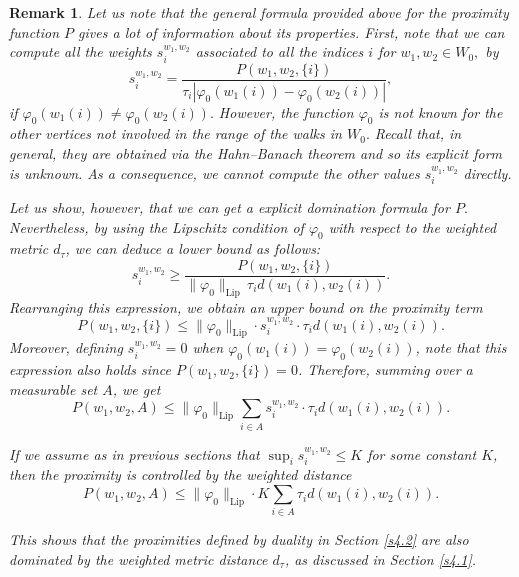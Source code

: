\documentclass[preprint,12pt]{elsarticle}
\newtheorem{remark}[theorem]{Remark}
\begin{document}
\begin{remark} \label{remal}
Let us note that the general formula provided above for the proximity function $P$ gives a lot of information about its properties. First, note that we can compute all the weights $s_i^{w_1,w_2}$ associated to all the indices  $i$ for $w_1,w_2 \in W_0,$ by
$$
s_i^{w_1,w_2} = \frac{ P(w_1, w_2, \{i\}) }{\tau_i \left| \varphi_0(w_1(i)) - \varphi_0(w_2(i)) \right|},
$$
if $\varphi_0(w_1(i))\neq\varphi_0(w_2(i)).$ 
However, the function $\varphi_0$ is not known for the other vertices not involved in the range of the walks in $W_0.$ Recall that, in general, they are obtained via the Hahn–Banach theorem and so its explicit form is unknown. 
As a consequence, we cannot compute the other values $s_i^{w_1,w_2}$ directly.

Let us show, however, that we can get a explicit domination formula for $P.$
Nevertheless, by using the Lipschitz condition of $\varphi_0$ with respect to the weighted metric $d_\tau$, we can deduce a lower bound as follows:
$$
s_i^{w_1,w_2} \geq \frac{ P(w_1, w_2, \{i\})}{\|\varphi_0\|_{\mathrm{Lip}} \, \tau_i d(w_1(i), w_2(i))}.
$$
Rearranging this expression, we obtain an upper bound on the proximity term
$$
P(w_1, w_2, \{i\}) \leq \|\varphi_0\|_{\mathrm{Lip}} \cdot s_i^{w_1,w_2} \cdot \tau_i d(w_1(i), w_2(i)).
$$
Moreover, defining $s_i^{w_1,w_2}=0$ when $\varphi_0(w_1(i))=\varphi_0(w_2(i))$, note that this expression also holds since $P(w_1, w_2, \{i\})=0$. Therefore, summing over a measurable set $A$, we get
$$
P(w_1, w_2, A) \leq \|\varphi_0\|_{\mathrm{Lip}} \sum_{i \in A} s_i^{w_1,w_2} \cdot \tau_i d(w_1(i), w_2(i)).
$$

If we assume as  in previous sections that $\sup_i s_i^{w_1,w_2} \leq K$ for some constant $K$, then the proximity is controlled by the weighted distance
$$
P(w_1, w_2, A) \leq \|\varphi_0\|_{\mathrm{Lip}} \cdot K \sum_{i \in A} \tau_i d(w_1(i), w_2(i)).
$$

This shows that the proximities defined by duality in Section \ref{s4.2} are also dominated by the weighted metric distance $d_\tau$, as discussed in Section \ref{s4.1}.
\end{remark}


\end{document}
